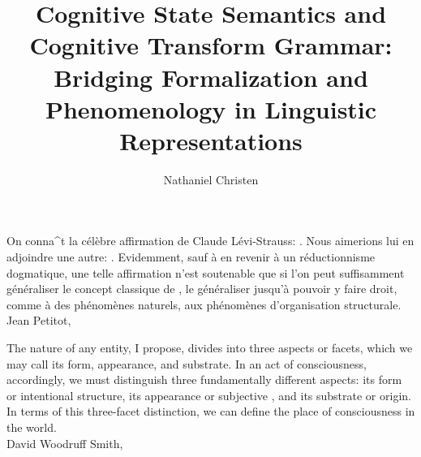 \documentclass[11pt,twocolumn]{article}
\begin{document}
\title{Cognitive State Semantics and Cognitive Transform Grammar: 
Bridging Formalization and Phenomenology in Linguistic Representations}
\author{Nathaniel Christen}
\newsavebox{\qboxi}
\newsavebox{\qboxii}
\begin{lrbox}{\qboxi}
\begin{frquote}On conna\^{\OldI}t la c\'{e}l\`{e}bre affirmation de Claude L\'{e}vi-Strauss: 
.  Nous aimerions lui en
adjoindre une autre: . 
Evidemment, sauf \`{a} en revenir \`{a} un r\'{e}ductionnisme dogmatique, une telle
affirmation n'est soutenable que si l'on peut suffisamment g\'{e}n\'{e}raliser le concept
classique de , le g\'{e}n\'{e}raliser jusqu'\`{a} pouvoir y faire droit, 
comme \`{a} des ph\'{e}nom\`{e}nes naturels, aux ph\'{e}nom\`{e}nes d'organisation structurale.
\\ \longdash{} Jean Petitot, \cite[p. 1]{PetitotSyntaxe}
\end{frquote}
\end{lrbox}	
\begin{lrbox}{\qboxii}
\begin{frquote}The nature of any entity, I propose, divides into three aspects or facets, which we may call its
	form, appearance, and substrate.  In an act of consciousness, accordingly, we must distinguish
	three fundamentally different aspects: its form or intentional structure, its appearance or
	subjective , and its substrate or origin.  In terms of this three-facet distinction, 
	we can define the place of consciousness in the world.
\\ \longdash{} David Woodruff Smith, \cite[p. 11]{DavidWoodruffSmith}
\end{frquote}
\end{lrbox}	
\twocolumn[\begin{@twocolumnfalse}
\maketitle{}
\begin{abstract}\end{abstract}
\begin{flushright}\usebox{\qboxi}
\usebox{\qboxii}
\end{flushright}
\decoline{}
\vspace{3em}
\end{@twocolumnfalse}]







\end{document}
